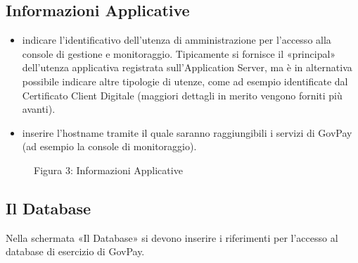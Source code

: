\documentclass[letterpaper,10pt,italian]{sphinxmanual}
\begin{document}
\subsection{Informazioni Applicative}
\label{\detokenize{configurazione/index:informazioni-applicative}}\begin{itemize}
\item {} 
 indicare l’identificativo dell’utenza di
amministrazione per l’accesso alla console di gestione e
monitoraggio. Tipicamente si fornisce il «principal» dell’utenza
applicativa registrata sull’Application Server, ma è in alternativa
possibile indicare altre tipologie di utenze, come ad esempio
identificate dal Certificato Client Digitale (maggiori dettagli in
merito vengono forniti più avanti).

\item {} 
 inserire l’hostname tramite il quale saranno
raggiungibili i servizi di GovPay (ad esempio la console di
monitoraggio).

\end{itemize}

\begin{figure}[htbp]
\centering
\capstart

\noindent{}
\caption{Figura 3: Informazioni Applicative}\label{\detokenize{configurazione/index:id3}}\end{figure}


\subsection{Il Database}
\label{\detokenize{configurazione/index:il-database}}
Nella schermata «Il Database» si devono inserire i riferimenti per
l’accesso al database di esercizio di GovPay.
\end{document}
